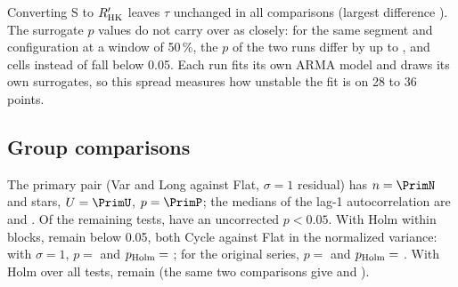 Converting S to $R'_{\rm HK}$ leaves $\tau$ unchanged in all \RHKNCompare{} comparisons (largest difference \RHKMaxDiff). The surrogate $p$ values do not carry over as closely: for the same segment and configuration at a window of 50\,\%, the $p$ of the two runs differ by up to \RHKMaxPDiff{}, and \NSigHalfRHK{} cells instead of \NSigHalf{} fall below 0.05. Each run fits its own ARMA model and draws its own surrogates, so this spread measures how unstable the fit is on 28 to 36 points.

\subsection{Group comparisons}

The primary pair (Var and Long against Flat, $\sigma = 1$ residual) has $n = \PrimN$ and \PrimNFlat{} stars, $U = \PrimU$, $p = \PrimP$; the medians of the lag-1 autocorrelation are \PrimMedVL{} and \PrimMedFlat. Of the \NHolmTests{} remaining tests, \NRawSig{} have an uncorrected $p < 0.05$. With Holm within blocks, \NHolmSig{} remain below 0.05, both Cycle against Flat in the normalized variance: with $\sigma = 1$, $p = $ \CycFlatPSOne{} and $p_{\rm Holm} = $ \CycFlatHolmSOne; for the original series, $p = $ \CycFlatPNone{} and $p_{\rm Holm} = $ \CycFlatHolmNone. With Holm over all \NHolmTests{} tests, \NHolmSigThirty{} remain (the same two comparisons give \CycFlatHolmThirtySOne{} and \CycFlatHolmThirtyNone).

